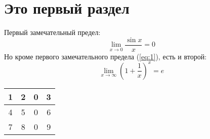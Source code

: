 \documentclass[11pt]{article}
\begin{document}
	\section{Это первый раздел}
	Первый замечательный предел:
	\begin{equation} \label{eq:1}
		\lim\limits_{x \to 0} \frac{\sin x}{x} = 0
   \end{equation}
   Но кроме первого замечательного предела (\ref{eq:1}), есть и второй:
   \begin{equation}
     \lim\limits_{x \to \infty} {\left( 1 + \frac{1}{x}\right)}^x = e
   \end{equation}
   \begin{tabular}{|c|c|c|c|}
   	\hline
   	1 & 2 & 0 & 3 \\ \hline
   	4 & 5 & 0 & 6 \\ \hline
   	7 & 8 & 0 & 9 \\ \hline
   \end{tabular} 
\end{document}
